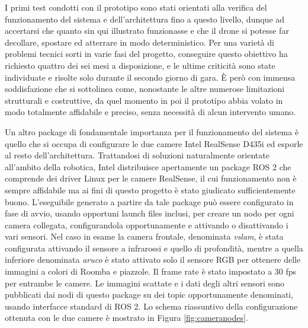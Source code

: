 I primi test condotti con il prototipo sono stati orientati alla verifica del funzionamento del sistema e dell'architettura fino a questo livello, dunque ad accertarsi che quanto sin qui illustrato funzionasse e che il drone si potesse far decollare, spostare ed atterrare in modo deterministico. Per una varietà di problemi tecnici sorti in varie fasi del progetto, conseguire questo obiettivo ha richiesto quattro dei sei mesi a disposizione, e le ultime criticità sono state individuate e risolte solo durante il secondo giorno di gara. È però con immensa soddisfazione che si sottolinea come, nonostante le altre numerose limitazioni strutturali e costruttive, da quel momento in poi il prototipo abbia volato in modo totalmente affidabile e preciso, senza necessità di alcun intervento umano.

\indent Un altro package di fondamentale importanza per il funzionamento del sistema è quello che si occupa di configurare le due camere Intel RealSense D435i ed esporle al resto dell'architettura. Trattandosi di soluzioni naturalmente orientate all'ambito della robotica, Intel distribuisce apertamente un package ROS 2 che comprende dei driver Linux per le camere RealSense, il cui funzionamento non è sempre affidabile ma ai fini di questo progetto è stato giudicato sufficientemente buono. L'eseguibile generato a partire da tale package può essere configurato in fase di avvio, usando opportuni launch files inclusi, per creare un nodo per ogni camera collegata, configurandola opportunamente e attivando o disattivando i vari sensori. Nel caso in esame la camera frontale, denominata \emph{vslam}, è stata configurata attivando il sensore a infrarossi e quello di profondità, mentre a quella inferiore denominata \emph{aruco} è stato attivato solo il sensore RGB per ottenere delle immagini a colori di Roomba e piazzole. Il frame rate è stato impostato a 30 fps per entrambe le camere. Le immagini scattate e i dati degli altri sensori sono pubblicati dai nodi di questo package su dei topic opportunamente denominati, usando interfacce standard di ROS 2. Lo schema riassuntivo della configurazione ottenuta con le due camere è mostrato in Figura \ref{fig:cameranodes}.

